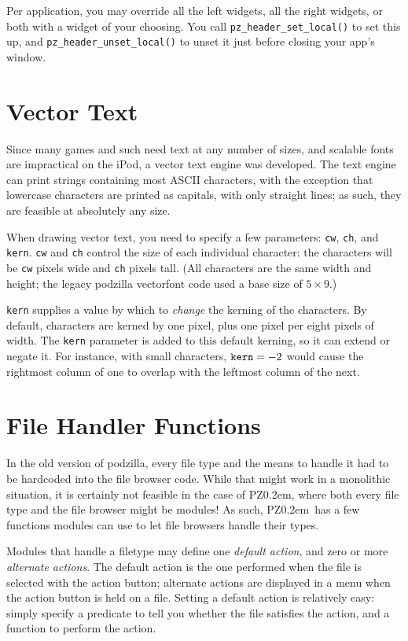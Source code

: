 \documentclass[12pt,letterpaper]{report}
\def\pz{{\footnotesize PZ}}
\def\pzt{\pz\kern0.2em{\large\oldstyle2}}
\begin{document}
Per application, you may override all the left widgets, all the right widgets, or both with
a widget of your choosing. You call \verb|pz_header_set_local()| to set this up, and
\verb|pz_header_unset_local()| to unset it just before closing your app's window.

\section{Vector Text}
Since many games and such need text at any number of sizes, and scalable fonts are impractical
on the iPod, a vector text engine was developed. The text engine can print strings containing
most ASCII characters, with the exception that lowercase characters are printed as capitals,
with only straight lines; as such, they are feasible at absolutely any size.

When drawing vector text, you need to specify a few parameters: \verb|cw|, \verb|ch|, and
\verb|kern|. \verb|cw| and \verb|ch| control the size of each individual character:
the characters will be \verb|cw| pixels wide and \verb|ch| pixels tall. (All characters
are the same width and height; the legacy podzilla vectorfont code used a base size of
$5\times9$.)

\verb|kern| supplies a value by which to {\it change} the kerning of the characters.
By default, characters are kerned by one pixel, plus one pixel per eight pixels of width.
The \verb|kern| parameter is added to this default kerning, so it can extend or negate it.
For instance, with small characters, $\verb|kern| = -2$ would cause the rightmost column
of one to overlap with the leftmost column of the next.

\section{File Handler Functions}
In the old version of podzilla, every file type and the means to handle it had to be hardcoded
into the file browser code. While that might work in a monolithic situation, it is certainly
not feasible in the case of \pzt, where both every file type and the file browser might be
modules! As such, \pzt\ has a few functions modules can use to let file browsers handle
their types.

Modules that handle a filetype may define one {\sl default action}, and zero or more {\sl
alternate actions}. The default action is the one performed when the file is selected
with the action button; alternate actions are displayed in a menu when the action button
is held on a file. Setting a default action is relatively easy: simply specify a predicate
to tell you whether the file satisfies the action, and a function to perform the action.
\end{document}
